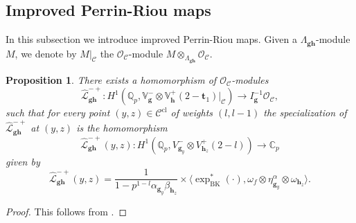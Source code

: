 \documentclass[a4paper,11pt]{amsart}
\theoremstyle{plain}
\newtheorem{theorem}{Theorem}[section]
\newtheorem{propo}[theorem]{Proposition}
\theoremstyle{definition}
\theoremstyle{remark}
\newtheorem{remarkwr}[theorem]{Remark}
\newenvironment{remark}{\begin{remarkwr}\begin{upshape}}{\end{upshape}\end{remarkwr}}
\newcommand{\cl}{\mathcal}
\DeclareMathOperator{\BK}{BK}
\newcommand{\Lp}{{\mathscr{L}_p}}
\newcommand{\hf}{{\mathbf{f}}}
\newcommand{\hg}{{\mathbf{g}}}
\newcommand{\hh}{{\mathbf h}}
\numberwithin{equation}{section}
\begin{document}



\subsection{Improved Perrin-Riou maps}\label{subsec:improvedPerrinRiou}


In this subsection we introduce improved Perrin-Riou maps.  Given a $\Lambda_{\hg\hh}$-module $M$, we denote by $M\vert_{\cl{C}}$ the $\cl{O}_{\cl{C}}$-module $M\otimes_{\Lambda_{\hg\hh}}\cl{O}_{\cl{C}}$.

\begin{propo}\label{perrin-improved1}
There exists a homomorphism of $\mathcal{O}_{\cl{C}}$-modules
\[
\widehat{\mathcal L}_{\hg \hh}^{-+}: H^1(\mathbb{Q}_p,\mathbb{V}_{\hg}^- \hat{\otimes} \mathbb{V}_{\hh}^+ (2-\mathbf{t}_1)|_{\mathcal C}) \rightarrow I_\hg^{-1} \cl{O}_{\cl{C}},
\]
such that for every point $(y,z) \in \mathcal{C}^{\mathrm{cl}}$ of weights $(l,l-1)$ the specialization of $\widehat{\mathcal L}_{\hg \hh}^{-+}$ at $(y,z)$ is the homomorphism
\[
\widehat{\mathcal L}_{{\hg\hh}}^{-+}(y,z): H^1(\mathbb Q_p, V_{\hg_y}^- \otimes V_{\hh_z}^+(2-l)) \rightarrow \mathbb C_p
\]
given by
\[
\widehat{\mathcal L}_{{\hg \hh}}^{-+}(y,z) = \frac{1}{1-p^{1-l} \alpha_{\hg_y} \beta_{\hh_z}}  \times \langle \exp_{\BK}^*(\cdot), \omega_{f} \otimes\eta_{\hg_y}^\alpha \otimes \omega_{\hh_z} \rangle.
\]
\end{propo}
\begin{proof}
This follows from \cite[Lemma~9.4]{BSV}.
\end{proof}
\end{document}
